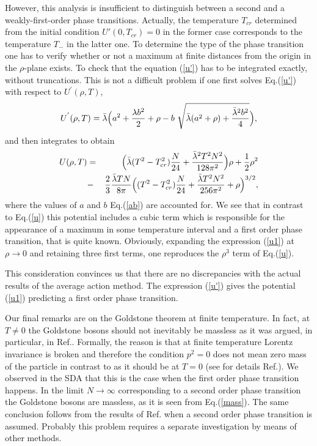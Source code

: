 \documentclass[a4paper,12pt]{article}
\begin{document}
However, this analysis is insufficient to distinguish between a second
and a weakly-first-order phase transitions.  Actually, the temperature
$T_{cr}$ determined from the initial condition $U'(0, T_{cr}) = 0$ in
the former case corresponds to the temperature $T_-$ in the latter
one. To determine the type of the phase transition one has to verify
whether or not a maximum at finite distances from the origin in the
$\rho$-plane exists. To check that the equation (\ref{u'}) has to be
integrated exactly, without truncations. This is not a difficult
problem if one first solves Eq.(\ref{u'}) with respect to $U^{'}
(\rho, T)$,
\begin{equation} \label{u'1}
U^{'} (\rho, T) = \bar{\lambda} \Bigl( a^2 + \frac{\lambda b^2}{2} +
\rho - b~ \sqrt{\bar{\lambda} (a^2 + \rho) + \frac{\bar{\lambda}^2
    b^2}{4} } \Bigr),
\end{equation}
and then integrates to obtain
\begin{eqnarray} \label{u1}
U (\rho, T) &=& \Bigl( \bar{\lambda} (T^2 - T_{cr}^2)\frac{N}{24} +
\frac{\bar{\lambda}^2 T^2 N^2}{128 \pi^2} \Bigr) \rho + \frac{1}{2}
\rho^2 \\ \nonumber
&-& \frac{2}{3} \frac{\bar{\lambda} T N}{8 \pi} \Bigl( (T^2 -
T_{cr}^2)\frac{N}{24} +\frac{\bar{\lambda} T^2 N^2}{256 \pi^2} +
 \rho \Bigr)^{3/2},
\end{eqnarray}
where the values of $a$ and $b$ Eq.(\ref{ab}) are accounted for. We
see that in contrast to Eq.(\ref{u}) this potential includes a cubic
term which is responsible for the appearance of a maximum in some
temperature interval and a first order phase transition, that is quite
known. Obviously, expanding the expression (\ref{u1}) at $\rho \to 0 $
and retaining three first terms, one reproduces the $\rho^3$ term of
Eq.(\ref{u}).

This consideration convinces us that there are no discrepancies with
the actual results of the average action method. The expression
(\ref{u'}) gives the potential (\ref{u1}) predicting a first order
phase transition.

Our final remarks are on the Goldstone theorem at finite temperature.
In fact, at $T \not = 0$ the Goldstone bosons should not inevitably be
massless as it was argued, in particular, in
Ref.\cite{Kowalski}. Formally, the reason is that at finite
temperature Lorentz invariance is broken and therefore the condition
$p^2 = 0$ does not mean zero mass of the particle in contrast to as it
should be at $T = 0$ (see for details Ref.\cite{Kowalski}).  We
observed in the SDA that this is the case when the first order phase
transition happens. In the limit $N \to \infty$ corresponding to a
second order phase transition the Goldstone bosons are massless, as it
is seen from Eq.(\ref{mass}). The same conclusion follows from the
results of Ref.\cite{Reuter} when a second order phase transition is
assumed. Probably this problem requires a separate investigation by
means of other methods.
\end{document}
